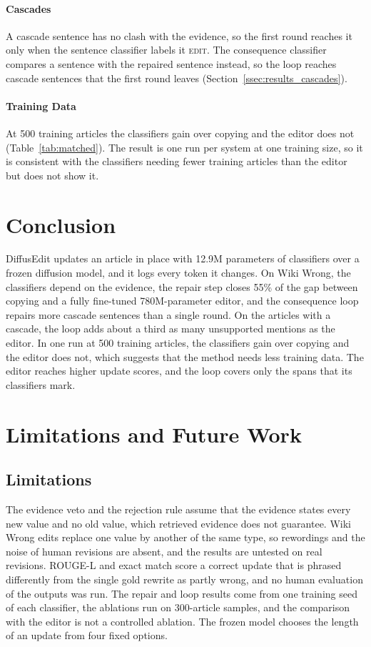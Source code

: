 \documentclass[11pt]{article}
\newcommand{\edit}{\textsc{edit}}
\begin{document}
\paragraph{Cascades}
A cascade sentence has no clash with the evidence, so the first round reaches it only when the sentence classifier labels it \edit{}. The consequence classifier compares a sentence with the repaired sentence instead, so the loop reaches cascade sentences that the first round leaves (Section~\ref{ssec:results_cascades}).

\paragraph{Training Data}
At 500 training articles the classifiers gain over copying and the editor does not (Table~\ref{tab:matched}). The result is one run per system at one training size, so it is consistent with the classifiers needing fewer training articles than the editor but does not show it.

\section{Conclusion}
DiffusEdit updates an article in place with 12.9M parameters of classifiers over a frozen diffusion model, and it logs every token it changes. On Wiki Wrong, the classifiers depend on the evidence, the repair step closes 55\% of the gap between copying and a fully fine-tuned 780M-parameter editor, and the consequence loop repairs more cascade sentences than a single round. On the articles with a cascade, the loop adds about a third as many unsupported mentions as the editor. In one run at 500 training articles, the classifiers gain over copying and the editor does not, which suggests that the method needs less training data. The editor reaches higher update scores, and the loop covers only the spans that its classifiers mark.

\section{Limitations and Future Work}

\subsection{Limitations}

The evidence veto and the rejection rule assume that the evidence states every new value and no old value, which retrieved evidence does not guarantee. Wiki Wrong edits replace one value by another of the same type, so rewordings and the noise of human revisions are absent, and the results are untested on real revisions. ROUGE-L and exact match score a correct update that is phrased differently from the single gold rewrite as partly wrong, and no human evaluation of the outputs was run. The repair and loop results come from one training seed of each classifier, the ablations run on 300-article samples, and the comparison with the editor is not a controlled ablation. The frozen model chooses the length of an update from four fixed options.
\end{document}
